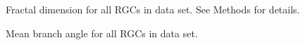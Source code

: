 \documentclass{article}
\begin{document}
\begin{figure}
  \centering
  \caption{Fractal dimension for all RGCs in data set. See Methods for
  details.}
\end{figure}

\clearpage

\begin{figure}
  \centering
  \caption{Mean branch angle for all RGCs in data set.}
\end{figure}

\clearpage
\end{document}
